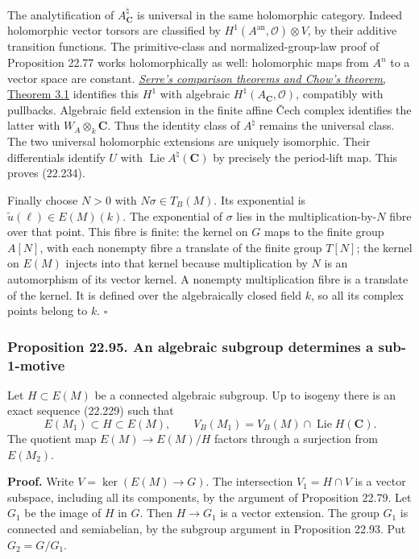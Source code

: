 \documentclass[
  11pt,
  a4paper,
]{article}
\newcounter{none} %
\begin{document}
The analytification of \(A^\natural_{\mathbf C}\) is universal in the
same holomorphic category. Indeed holomorphic vector torsors are
classified by \(H^1(A^{\mathrm{an}},\mathcal O)\otimes V\), by their
additive transition functions. The primitive-class and
normalized-group-law proof of Proposition 22.77 works holomorphically as
well: holomorphic maps from \(A^n\) to a vector space are constant.
\href{https://kokunoyumeto.github.io/open-math-courses-public/courses/AG-QC/serres-comparison-theorems-and-chows-theorem.html\#3-the-first-comparison-theorem}{\emph{Serre's
comparison theorems and Chow's theorem}, Theorem 3.1} identifies this
\(H^1\) with algebraic \(H^1(A_{\mathbf C},\mathcal O)\), compatibly
with pullbacks. Algebraic field extension in the finite affine Čech
complex identifies the latter with \(W_A\otimes_k\mathbf C\). Thus the
identity class of \(A^\natural\) remains the universal class. The two
universal holomorphic extensions are uniquely isomorphic. Their
differentials identify \(U\) with
\(\operatorname{Lie}A^\natural(\mathbf C)\) by precisely the period-lift
map. This proves (22.234).

Finally choose \(N>0\) with \(N\sigma\in T_B(M)\). Its exponential is
\(\widetilde u(\ell)\in E(M)(k)\). The exponential of \(\sigma\) lies in
the multiplication-by-\(N\) fibre over that point. This fibre is finite:
the kernel on \(G\) maps to the finite group \(A[N]\), with each
nonempty fibre a translate of the finite group \(T[N]\); the kernel on
\(E(M)\) injects into that kernel because multiplication by \(N\) is an
automorphism of its vector kernel. A nonempty multiplication fibre is a
translate of the kernel. It is defined over the algebraically closed
field \(k\), so all its complex points belong to \(k\). \(\square\)

\subsubsection{Proposition 22.95. An algebraic subgroup determines a
sub-1-motive}\label{proposition-22.95.-an-algebraic-subgroup-determines-a-sub-1-motive}

Let \(H\subset E(M)\) be a connected algebraic subgroup. Up to isogeny
there is an exact sequence (22.229) such that \[
 E(M_1)\subset H\subset E(M),\qquad
 V_B(M_1)=V_B(M)\cap\operatorname{Lie}H(\mathbf C).
 \tag{22.237}
\] The quotient map \(E(M)\to E(M)/H\) factors through a surjection from
\(E(M_2)\).

\textbf{Proof.} Write \(V=\ker(E(M)\to G)\). The intersection
\(V_1=H\cap V\) is a vector subspace, including all its components, by
the argument of Proposition 22.79. Let \(G_1\) be the image of \(H\) in
\(G\). Then \(H\to G_1\) is a vector extension. The group \(G_1\) is
connected and semiabelian, by the subgroup argument in Proposition
22.93. Put \(G_2=G/G_1\).
\end{document}
